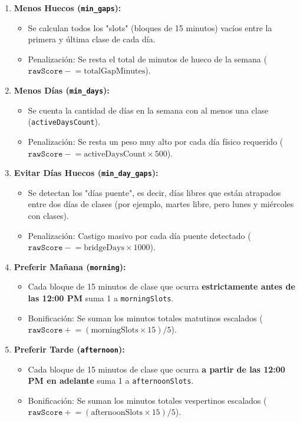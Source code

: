 \documentclass[12pt,a4paper]{article}
\begin{document}
\begin{enumerate}
    \item \textbf{Menos Huecos (\texttt{min\_gaps}):}
    \begin{itemize}
        \item Se calculan todos los "slots" (bloques de 15 minutos) vacíos entre la primera y última clase de cada día.
        \item Penalización: Se resta el total de minutos de hueco de la semana ($\texttt{rawScore} \mathrel{-}= \text{totalGapMinutes}$).
    \end{itemize}
    
    \item \textbf{Menos Días (\texttt{min\_days}):}
    \begin{itemize}
        \item Se cuenta la cantidad de días en la semana con al menos una clase (\texttt{activeDaysCount}).
        \item Penalización: Se resta un peso muy alto por cada día físico requerido ($\texttt{rawScore} \mathrel{-}= \text{activeDaysCount} \times 500$).
    \end{itemize}

    \item \textbf{Evitar Días Huecos (\texttt{min\_day\_gaps}):}
    \begin{itemize}
        \item Se detectan los "días puente", es decir, días libres que están atrapados entre dos días de clases (por ejemplo, martes libre, pero lunes y miércoles con clases).
        \item Penalización: Castigo masivo por cada día puente detectado ($\texttt{rawScore} \mathrel{-}= \text{bridgeDays} \times 1000$).
    \end{itemize}

    \item \textbf{Preferir Mañana (\texttt{morning}):}
    \begin{itemize}
        \item Cada bloque de 15 minutos de clase que ocurra \textbf{estrictamente antes de las 12:00 PM} suma 1 a \texttt{morningSlots}.
        \item Bonificación: Se suman los minutos totales matutinos escalados ($\texttt{rawScore} \mathrel{+}= (\text{morningSlots} \times 15) / 5$).
    \end{itemize}

    \item \textbf{Preferir Tarde (\texttt{afternoon}):}
    \begin{itemize}
        \item Cada bloque de 15 minutos de clase que ocurra \textbf{a partir de las 12:00 PM en adelante} suma 1 a \texttt{afternoonSlots}.
        \item Bonificación: Se suman los minutos totales vespertinos escalados ($\texttt{rawScore} \mathrel{+}= (\text{afternoonSlots} \times 15) / 5$).
    \end{itemize}


\end{enumerate}
\end{document}
